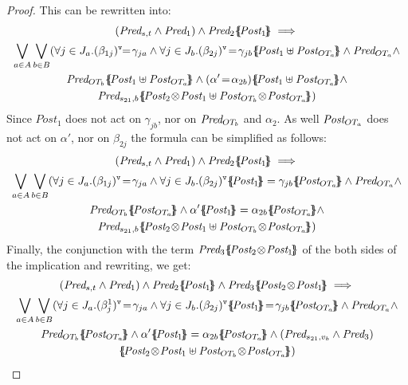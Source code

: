 \documentclass{lmcs}
\newcommand{\shortotimes}{\!\otimes\!}
\begin{document}
\begin{proof}
This can be rewritten into:
\begin{multline*}(\Pred_{s,t} \land \Pred_1)\wedge\Pred_2\subst{\Post_1} \implies\\
{\bigvee_{a\in A}}\, {\bigvee_{b\in B}} 
(\forall j\in J_a. \vis{\beta_{1j}}\!\!=\!\gamma_{ja} \land  \forall j \in J_{b}. \vis{\beta_{2j}}\!=\!\gamma_{jb}\subst{\Post_1\uplus\Post_{OT_a}}   \land\Pred_{OT_a} \land \\ \Pred_{OT_{b}} \subst{\Post_1\uplus\Post_{OT_a}} \land  (\alpha'\!=\!\alpha_{2 b}) \subst{\Post_1\uplus\Post_{OT_a}} \land \\ \Pred_{s_{21},b}\subst{\Post_2\shortotimes\Post_1\uplus \Post_{OT_{b}}\shortotimes \Post_{OT_a}})
\end{multline*}
Since $Post_1$  does not act on $\gamma_{jb}$, nor on $ \Pred_{OT_{b}}$ and $  \alpha_{2}$. As well $\Post_{OT_a}$  does not act on $\alpha'$, nor on  $\beta_{2j}$ the formula can be simplified as follows:
\begin{multline*}(\Pred_{s,t} \land \Pred_1)\wedge\Pred_2\subst{\Post_1}\implies\\
\displaystyle{\bigvee_{a\in A}}\, \displaystyle{\bigvee_{b\in B}} 
(\forall j\in J_a. \vis{\beta_{1j}}\!=\!\gamma_{ja} \land  \forall j \in J_{b}. \vis{\beta_{2j}}\subst{\Post_1}=\gamma_{jb} \subst{\Post_{OT_a}}  \land\Pred_{OT_a} \land \\ \Pred_{OT_{b}} \subst{\Post_{OT_a}} \land \alpha'\subst{\Post_1}=\alpha_{2 b} \subst{\Post_{OT_a}} \land\\ \Pred_{s_{21},b}\subst{\Post_2\shortotimes\Post_1\uplus \Post_{OT_{b}}\shortotimes \Post_{OT_a}})\end{multline*}
Finally, the conjunction with the term $\Pred_3\subst{\Post_2\shortotimes\Post_1}$ of the both sides of the implication and rewriting, we get:
\begin{multline*}(\Pred_{s,t} \land \Pred_1)\wedge\Pred_2\subst{\Post_1} \land \Pred_3\subst{\Post_2\shortotimes\Post_1}\implies \\
\displaystyle{\bigvee_{a\in A}}\, \displaystyle{\bigvee_{b\in B}} 
(\forall j\in J_a.\vis{\beta^1_j}\!=\!\gamma_{ja} \land  \forall j \in J_{b}. \vis{\beta_{2j}}\subst{\Post_1}\!=\!\gamma_{jb} \subst{\Post_{OT_a}}\land \Pred_{OT_a}\land\\\Pred_{OT_{b}}\subst{\Post_{OT_a}} \land  \alpha'\subst{\Post_1}= \alpha_{2 b} \subst{\Post_{OT_a}} \land (\Pred_{s_{21},v_b} \land  \Pred_3)\\ \subst{\Post_2\shortotimes \Post_1\uplus \Post_{OT_{b}}\shortotimes\Post_{OT_a}})\end{multline*} 

\end{proof}
\end{document}
